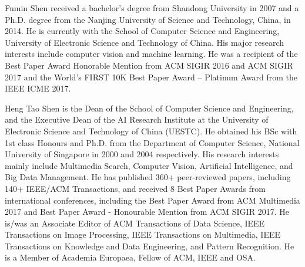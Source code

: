 \documentclass[lettersize,journal]{IEEEtran}
\begin{document}
\vspace{-10pt}
\begin{IEEEbiography}
	{Fumin Shen}
	received a bachelor's degree from Shandong University in 2007 and a Ph.D. degree from the Nanjing University of Science and Technology, China, in 2014. He is currently with the School of Computer Science and Engineering, University of Electronic Science and Technology of China. His major research interests include computer vision and machine learning. He was a recipient of the Best Paper Award Honorable Mention from ACM SIGIR 2016 and ACM SIGIR 2017 and the World's FIRST 10K Best Paper Award -- Platinum Award from the IEEE ICME 2017.
\end{IEEEbiography}
\vspace{-10pt}
\begin{IEEEbiography}
	{Heng Tao Shen} 
	is the Dean of the School of Computer Science and Engineering, and the Executive Dean of the AI Research Institute at the University of Electronic Science and Technology of China (UESTC). He obtained his BSc with 1st class Honours and Ph.D. from the Department of Computer Science, National University of Singapore in 2000 and 2004 respectively. His research interests mainly include Multimedia Search, Computer Vision, Artificial Intelligence, and Big Data Management. He has published 360+ peer-reviewed papers, including 140+ IEEE/ACM Transactions, and received 8 Best Paper Awards from international conferences, including the Best Paper Award from ACM Multimedia 2017 and Best Paper Award - Honourable Mention from ACM SIGIR 2017. He is/was an Associate Editor of ACM Transactions of Data Science, IEEE Transactions on Image Processing, IEEE Transactions on Multimedia, IEEE Transactions on Knowledge and Data Engineering, and Pattern Recognition. He is a Member of Academia Europaea, Fellow of ACM, IEEE and OSA.  
\end{IEEEbiography}
\end{document}
